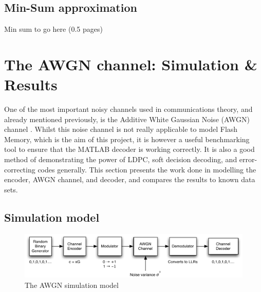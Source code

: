 \documentclass[11pt]{article}
\numberwithin{equation}{subsection}
\begin{document}
\subsection{Min-Sum approximation}

Min sum to go here (0.5 pages)

\section{The AWGN channel: Simulation \& Results}
One of the most important noisy channels used in communications theory, and already mentioned previously, is the Additive White Gaussian Noise (AWGN) channel \cite{johnson2009iterative,tse2005fundamentals,proakis2001digital,haykin2008communication}. Whilst this noise channel is not really applicable to model Flash Memory, which is the aim of this project, it is however a useful benchmarking tool to ensure that the MATLAB decoder is working correctly. It is also a good method of demonstrating the power of LDPC, soft decision decoding, and error-correcting codes generally. This section presents the work done in modelling the encoder, AWGN channel, and decoder, and compares the results to known data sets.

\subsection{Simulation model}
\begin{figure}[h]
\centering
\includegraphics[scale=0.878]{awgn_channel_model}
\caption{The AWGN simulation model}
\label{figure:awgn sim model}
\end{figure}
\end{document}
